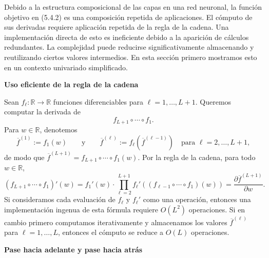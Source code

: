 \documentclass[11pt]{report}
\theoremstyle{definition}
\theoremstyle{plain}
\numberwithin{equation}{section}
\begin{document}
Debido a la estructura composicional de las capas en una red neuronal, la función objetivo en (5.4.2) es una composición repetida de aplicaciones. El cómputo de sus derivadas requiere aplicación repetida de la regla de la cadena. Una implementación directa de esto es ineficiente debido a la aparición de cálculos redundantes. La complejidad puede reducirse significativamente almacenando y reutilizando ciertos valores intermedios. En esta sección primero mostramos esto en un contexto univariado simplificado.

\textbf{Uso eficiente de la regla de la cadena}

Sean \(f_\ell:\mathbb{R}\to\mathbb{R}\) funciones diferenciables para \(\ell=1,\ldots,L+1\). Queremos computar la derivada de
\begin{equation*}
    f_{L+1}\circ\cdots\circ f_1.
\end{equation*}
Para \(w\in\mathbb{R}\), denotemos
\begin{equation*}
    \overline{f}^{(1)}:=f_1(w)
    \qquad
    \text{y}
    \qquad
    \overline{f}^{(\ell)}:=f_\ell(\overline{f}^{(\ell-1)})
    \quad
    \text{para } \ell=2,\ldots,L+1,
\end{equation*}
de modo que \(\overline{f}^{(L+1)}=f_{L+1}\circ\cdots\circ f_1(w)\). Por la regla de la cadena, para todo \(w\in\mathbb{R}\),
\begin{equation*}
    (f_{L+1}\circ\cdots\circ f_1)'(w)
    =
    f_1'(w)
    \cdot
    \prod_{\ell=2}^{L+1}
    f_\ell'((f_{\ell-1}\circ\cdots\circ f_1)(w))
    =
    \frac{\partial\overline{f}^{(L+1)}}{\partial w}.
\end{equation*}
Si consideramos cada evaluación de \(f_\ell\) y \(f_\ell'\) como una operación, entonces una implementación ingenua de esta fórmula requiere \(O(L^2)\) operaciones. Si en cambio primero computamos iterativamente y almacenamos los valores \(\overline{f}^{(\ell)}\) para \(\ell=1,\ldots,L\), entonces el cómputo se reduce a \(O(L)\) operaciones.

\textbf{Pase hacia adelante y pase hacia atrás}
\end{document}
